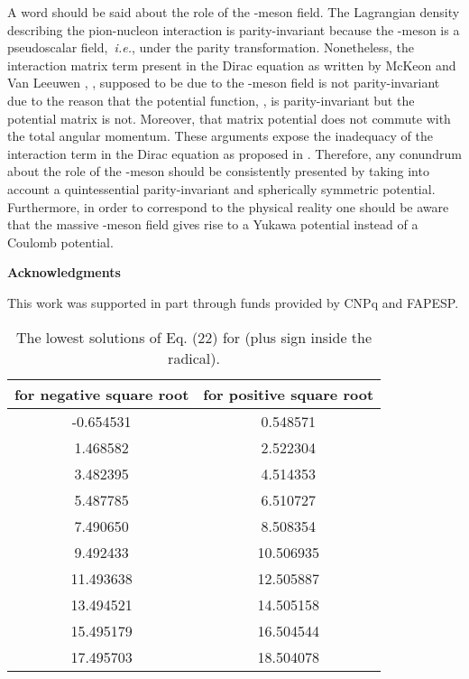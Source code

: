 \documentclass[a4paper,12pt,titlepage]{article}
\begin{document}
A word should be said about the role of the \myHighlight{$\pi $}\coordHE{}-meson field. The
Lagrangian density describing the pion-nucleon interaction \coordHE{} is parity-invariant because
the \myHighlight{$\pi $}\coordHE{}-meson is a pseudoscalar field,\textit{\ i.e.}, \coordHE{} under the parity transformation.
Nonetheless, the interaction matrix term present in the Dirac equation as
written by McKeon and Van Leeuwen \cite{mck}, \coordHE{},
supposed to be due to the \myHighlight{$\pi $}\coordHE{}-meson field is not parity-invariant due to
the reason that the potential function, \coordHE{}, is parity-invariant but the
potential matrix is not. Moreover, that matrix potential does not commute
with the total angular momentum. These arguments expose the inadequacy of
the interaction term in the Dirac equation as proposed in \cite{mck}.
Therefore, any conundrum about the role of the \myHighlight{$\pi $}\coordHE{}-meson should be
consistently presented  by taking into account a quintessential
parity-invariant and spherically symmetric potential. Furthermore, in order
to correspond to the physical reality one should be aware that the massive \myHighlight{$%
\pi $}\coordHE{}-meson field gives rise to a Yukawa potential instead of a Coulomb
potential.

\bigskip

\noindent \textbf{Acknowledgments}

This work was supported in part through funds provided by CNPq and FAPESP.

\smallskip 
\begin{table}[tbp]
\caption{The lowest solutions of Eq. (22) for \coordHE{} (plus sign inside
the radical).}
\label{t1}
\begin{center}
\begin{tabular}{|c|c|}
\hline\hline
\myHighlight{$\nu$}\coordHE{} \rm{for negative square root} & \myHighlight{$\nu$}\coordHE{} \rm {for positive square
root} \\ \hline
-0.654531 & 0.548571 \\ 
1.468582 & 2.522304 \\ 
3.482395 & 4.514353 \\ 
5.487785 & 6.510727 \\ 
7.490650 & 8.508354 \\ 
9.492433 & 10.506935 \\ 
11.493638 & 12.505887 \\ 
13.494521 & 14.505158 \\ 
15.495179 & 16.504544 \\ 
17.495703 & 18.504078 \\ \hline\hline
\end{tabular}
\end{center}
\end{table}
\end{document}
